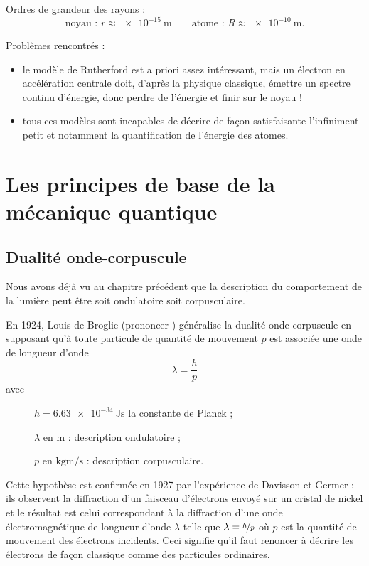 Ordres de grandeur des rayons : \[\text{noyau : }r\approx\SI{e-15}{\meter}\qquad\text{atome : }R\approx\SI{e-10}{\meter}.\]

Problèmes rencontrés :

\begin{itemize}
    \item le modèle de Rutherford est a priori assez intéressant, mais un électron en accélération centrale doit, d'après la physique classique, émettre un spectre continu d'énergie, donc perdre de l'énergie et finir sur le noyau ! \\
    \item tous ces modèles sont incapables de décrire de façon satisfaisante l'infiniment petit et notamment la quantification de l'énergie des atomes.
\end{itemize}

\section{Les principes de base de la mécanique quantique}

\subsection{Dualité onde-corpuscule}

Nous avons déjà vu au chapitre précédent que la description du comportement de la lumière peut être soit ondulatoire soit corpusculaire.

En 1924, Louis de Broglie (prononcer ) généralise la dualité onde-corpuscule en supposant qu'à toute particule de quantité de mouvement \(p\) est associée une onde de longueur d'onde \[\lambda=\dfrac{h}{p}\] avec \begin{description}
    \item[] \(h=\SI{6.63e-34}{\joule\second}\) la constante de Planck ;
    \item[] \(\lambda\) en \(\unit{\meter}\) : description ondulatoire ;
    \item[] \(p\) en \(\unit{\kilo\gram\meter\per\second}\) : description corpusculaire. \\
\end{description}

Cette hypothèse est confirmée en 1927 par l'expérience de Davisson et Germer : ils observent la diffraction d'un faisceau d'électrons envoyé sur un cristal de nickel et le résultat est celui correspondant à la diffraction d'une onde électromagnétique de longueur d'onde \(\lambda\) telle que \(\lambda=\nicefrac{h}{p}\) où \(p\) est la quantité de mouvement des électrons incidents. Ceci signifie qu'il faut renoncer à décrire les électrons de façon classique comme des particules ordinaires.

